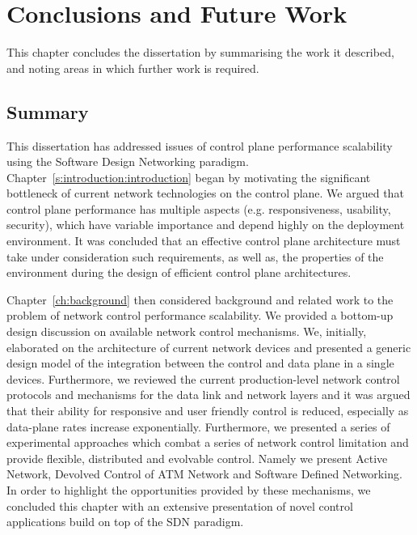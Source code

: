 \def\baselinestretch{1}
\chapter{Conclusions and Future Work} \label{sec:conclusions}

\def\baselinestretch{1.66}

This chapter concludes the dissertation by summarising the work it described,
and noting areas in which further work is required.

\section{Summary}

This dissertation has addressed issues of control plane performance scalability
using the Software Design Networking paradigm.
Chapter~\ref{s:introduction:introduction} began by motivating the significant
bottleneck of current network technologies on the control plane. We
argued that control plane performance has multiple aspects (e.g. responsiveness,
usability, security), which have variable importance and depend highly on the
deployment environment. It was concluded that an effective control plane
architecture must take under consideration such requirements, as well as, the
properties of the environment during the design of efficient control plane
architectures. 

Chapter~\ref{ch:background} then considered background and related work to the
problem of network control performance scalability. We provided a bottom-up design discussion on
available network control mechanisms. We, initially, elaborated on the
architecture of current network devices and presented a generic design model of the
integration between the control and data plane in a single devices. Furthermore,
we reviewed the current production-level network control protocols and
mechanisms for the data link and network layers and it was argued that their
ability for responsive and user friendly control is reduced, especially as
data-plane rates increase exponentially. Furthermore, we presented a series of
experimental approaches which combat a series of network control limitation and
provide flexible, distributed and evolvable control.  Namely we present Active
Network, Devolved Control of ATM Network and Software Defined Networking. In
order to highlight the opportunities provided by these mechanisms, we concluded
this chapter with an extensive presentation of novel control applications build
on top of the SDN paradigm. 

